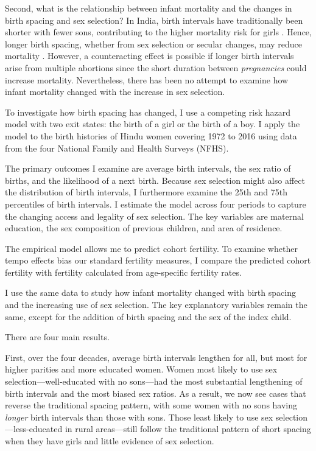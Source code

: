 \documentclass[12pt,letterpaper]{article}
\begin{document}
Second, what is the relationship between infant mortality and the changes in birth spacing 
and sex selection?
In India, birth intervals have traditionally been shorter with fewer sons, contributing 
to the higher mortality risk for girls
\citep{Whitworth2002,Bhalotra2008,Maitra2008,Jayachandran2011,Jayachandran2017a}.
Hence, longer birth spacing, whether from sex selection or secular changes, may reduce 
mortality \citep{Conde-Agudelo2012,Molitoris2019}.
However, a counteracting effect is possible if longer birth intervals arise from multiple 
abortions since the short duration between \emph{pregnancies} could increase mortality. 
Nevertheless, there has been no attempt to examine how infant mortality changed with 
the increase in sex selection.


To investigate how birth spacing has changed, I use a competing risk hazard model with 
two exit states: the birth of a girl or the birth of a boy. 
I apply the model to the birth histories of Hindu women covering 1972 to 2016 using 
data from the four National Family and Health Surveys (NFHS). 

The primary outcomes I examine are average birth intervals, the sex ratio of births, 
and the likelihood of a next birth. 
Because sex selection might also affect the distribution of birth intervals, I furthermore
examine the 25th and 75th percentiles of birth intervals. 
I estimate the model across four periods to capture the changing access and 
legality of sex selection. 
The key variables are maternal education, the sex composition of previous 
children, and area of residence.

The empirical model allows me to predict cohort fertility. 
To examine whether tempo effects bias our standard fertility measures, I compare 
the predicted cohort fertility with fertility calculated from age-specific fertility 
rates.

I use the same data to study how infant mortality changed with birth spacing and 
the increasing use of sex selection. 
The key explanatory variables remain the same, except for the addition of birth spacing 
and the sex of the index child. 

There are four main results.

First, over the four decades, average birth intervals lengthen for all, but most for higher 
parities and more educated women. 
Women most likely to use sex selection---well-educated with no sons---had the most 
substantial lengthening of birth intervals and the most biased sex ratios. 
As a result, we now see cases that reverse the traditional spacing pattern, with some 
women with no sons having \emph{longer} birth intervals than those with sons. 
Those least likely to use sex selection---less-educated in rural areas---still follow 
the traditional pattern of short spacing when they have girls and little evidence of sex 
selection.
\end{document}
